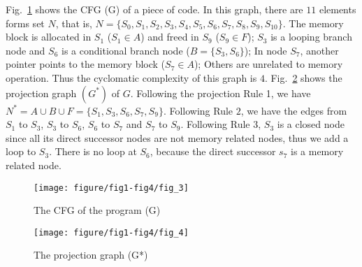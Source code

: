 Fig.~\ref{figure3} shows the CFG (G) of a piece of code. In this graph, there are $11$ elements forms set $N$, that is, $N = \{S_0, S_1, S_2, S_3, S_4, S_5, S_6, S_7, S_8, S_9, S_{10}\}$. The memory block is allocated in $S_1$ ($S_1\in A$) and freed in $S_9$ ($S_9\in F$); $S_3$ is a looping branch node and $S_6$ is a conditional branch node ($B=\{S_3, S_6\}$); In node $S_7$, another pointer points to the memory block ($S_7\in A$); Others are unrelated to memory operation. Thus the cyclomatic complexity of this graph is $4$.
Fig.~\ref{fig:4} shows the projection graph $(G^*)$ of $G$. Following the projection Rule 1, we have $N^*=A\cup B\cup F=\{S_1, S_3, S_6, S_7, S_9\}$. Following Rule $2$, we have the edges from $S_1$ to $S_3$, $S_3$ to $S_6$, $S_6$ to $S_7$ and $S_7$ to $S_9$. Following Rule $3$, $S_3$ is a closed node since all its direct successor nodes are not memory related nodes, thus we add a loop to $S_3$. There is no loop at $S_6$, because the direct successor $s_7$ is a memory related node.  

\begin{figure}[!h]
\center
\texttt{[image: figure/fig1-fig4/fig\_3]}
\caption{The CFG of the program (G)}
\label{figure3}
\end{figure}

\begin{figure}[!h]
\center
\texttt{[image: figure/fig1-fig4/fig\_4]}
\caption{The projection graph (G*)}
\label{fig:4}
\end{figure}

